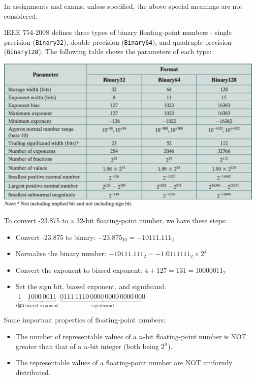 \begin{remark}
    In assignments and exams, unless specified, the above special meanings are not considered.
\end{remark}

IEEE 754-2008 defines three types of binary floating-point numbers - 
single precision (\texttt{Binary32}), double precision (\texttt{Binary64}), and
quadruple precision (\texttt{Binary128}). The following table shows the parameters of each type:

\begin{center}
    \includegraphics[scale=0.3]{chaps/number-representation/ieee-754-binary-float-parameters.png}
\end{center}

\begin{example}
    To convert -23.875 to a 32-bit floating-point number, we have these steps:
    \begin{itemize}
        \item Convert -23.875 to binary: $-23.875_{10} = -10111.111_2$
        \item Normalise the binary number: $-10111.111_2 = -1.0111111_2\times 2^4$
        \item Convert the exponent to biased exponent: $4 + 127 = 131 = 10000011_2$
        \item Set the sign bit, biased exponent, and significand:
            $\boxed{\underbrace{1}_{\text{sign}}\,\underbrace{1000\,0011}_{\text{biased exponent}}\,
            \underbrace{0111\,1110\,0000\,0000\,0000\,000}_{\text{significand}}}$
    \end{itemize}
\end{example}

\begin{theorem}
    Some important properties of floating-point numbers:
    \begin{itemize}
        \item The number of representable values of a $n$-bit floating-point number is
            NOT greater than that of a $n$-bit integer (both being $2^n$).
        \item The representable values of a floating-point number are NOT uniformly distributed.
    \end{itemize}
\end{theorem}

